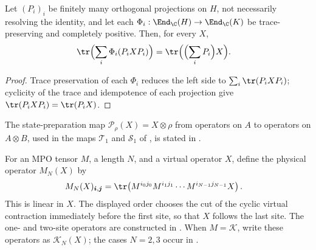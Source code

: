 \begin{lemma}
    \label{lem:mpdo_projector_controlled_trace_selection}
    \leanok

    Let $(P_i)_i$ be finitely many orthogonal projections on $H$, not
    necessarily resolving the identity, and let each
    $\Phi_i:\End_{\C}(H)\to\End_{\C}(K)$ be trace-preserving and
    completely positive. Then, for every $X$,
    \begin{align}
        \tr\Bigl(\sum_i\Phi_i(P_iXP_i)\Bigr)
         & =\tr\Bigl(\Bigl(\sum_iP_i\Bigr)X\Bigr).
        \notag
    \end{align}
\end{lemma}
\begin{proof}\leanok
    Trace preservation of each $\Phi_i$ reduces the left side to
    $\sum_i\tr(P_iXP_i)$; cyclicity of the trace and idempotence of each
    projection give $\tr(P_iXP_i)=\tr(P_iX)$.
\end{proof}



The state-preparation map $\mathcal P_\rho(X)=X\otimes\rho$ from operators on
$A$ to operators on $A\otimes B$, used in the maps $\mathcal T_1$ and
$\mathcal S_1$ of
\cite[Appendix~C.2, lines~1527--1533 and~1551--1555]{Cirac2016MPDO_arXiv},
is stated in \cite[``State-preparation map'']{QICLean2026Blueprint}.


\begin{definition}
    \label{def:phys_close}
    \leanok
    For an MPO tensor $M$, a length $N$, and a virtual operator $X$, define the
    physical operator $M_N(X)$ by
    \begin{align}
        M_N(X)_{\boldsymbol i,\boldsymbol j}
         & =
        \tr\!\left(M^{i_0j_0}M^{i_1j_1}\cdots M^{i_{N-1}j_{N-1}}X\right).
        \notag
    \end{align}
    This is linear in $X$. The displayed order chooses the cut of the cyclic
    virtual contraction immediately before the first site, so that $X$ follows
    the last site. The one- and two-site operators are constructed in
    \cite[lines~638--654 and Definition~4.1]{Cirac2016MPDO_arXiv}. When
    $M=\mathcal K$, write these operators as $\mathcal K_N(X)$; the cases
    $N=2,3$ occur in
    \cite[Proposition~C.7, lines~1510--1516]{Cirac2016MPDO_arXiv}.
\end{definition}

